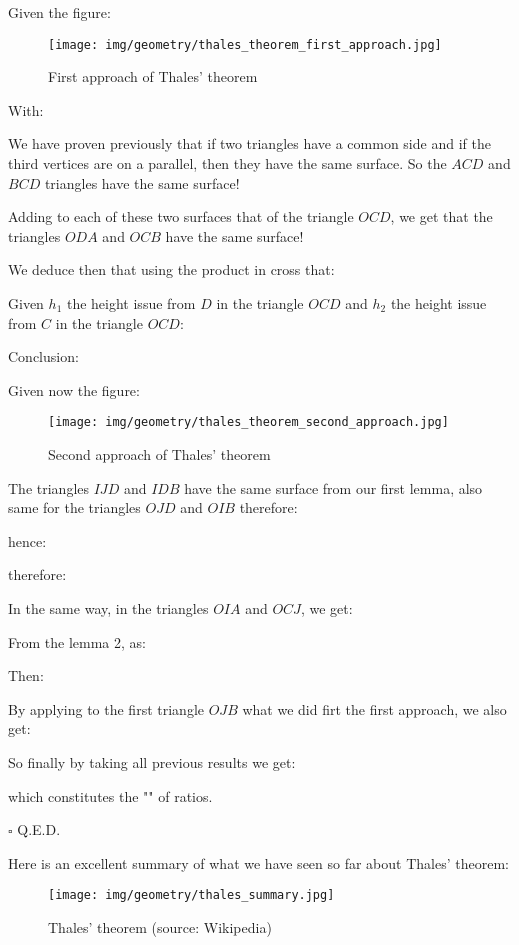 	\begin{dem}
	Given the figure:
	\begin{figure}[H]
		\centering
		\texttt{[image: img/geometry/thales\_theorem\_first\_approach.jpg]}
		\caption{First approach of Thales' theorem}
	\end{figure}
	With:
	
	We have proven previously that if two triangles have a common side and if the third vertices are on a parallel, then they have the same surface. So the $ACD$ and $BCD$ triangles have the same surface!

	Adding to each of these two surfaces that of the triangle $OCD$, we get that the triangles $ODA$ and $OCB$ have the same surface!

	We deduce then that using the product in cross that:
	
	Given $h_1$ the height issue from $D$ in the triangle $OCD$ and $h_2$ the height issue from $C$ in the triangle $OCD$:
	
	Conclusion:
	
	Given now the figure:
	\begin{figure}[H]
		\centering
		\texttt{[image: img/geometry/thales\_theorem\_second\_approach.jpg]}
		\caption{Second approach of Thales' theorem}
	\end{figure}
	The triangles $IJD$ and $IDB$ have the same surface from our first lemma, also same for the triangles $OJD$ and $OIB$ therefore:
	
	hence:
	
	therefore:
	
	In the same way, in the triangles $OIA$ and $OCJ$, we get:
	
	From the lemma 2, as:
	
	Then:
	
	By applying to the first triangle $OJB$ what we did firt the first approach, we also get:
	
	So finally by taking all previous results we get:
	
	which constitutes the "" of ratios.
	\begin{flushright}
		$\square$  Q.E.D.
	\end{flushright}
	\end{dem}
	
	Here is an excellent summary of what we have seen so far about Thales' theorem:
	\begin{figure}[H]
		\centering
		\texttt{[image: img/geometry/thales\_summary.jpg]}
		\caption{Thales' theorem (source: Wikipedia)}
	\end{figure}
	

